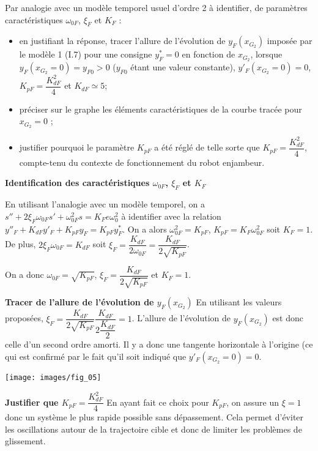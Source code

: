 \documentclass[11pt]{article}
\begin{document}
\UPSTIquestion Par analogie avec un modèle temporel usuel d’ordre 2 à identifier, de paramètres caractéristiques $\omega_{0F}$, $\xi_F$ et $K_F$ :
\begin{itemize}
\item en justifiant la réponse, tracer l’allure de l’évolution de  $y_F\left(x_{G_2}\right)$  imposée par le modèle 1 (I.7) pour une consigne $y_F^*=0$ en fonction de $x_{G_2}$, lorsque $y_F\left(x_{G_2}=0\right)=y_{F0}>0$
 ($y_{F0}$ étant une valeur constante), $y'_F\left(x_{G_2}=0\right)=0$, $K_{pF}=\dfrac{K^2_{dF}}{4}$ et $K_{dF}\simeq 5$; 
 \item préciser sur le graphe les éléments caractéristiques de la courbe tracée pour $x_{G_2}=0$ ;
\item justifier pourquoi le paramètre $K_{pF}$ a été réglé de telle sorte que $K_{pF}=\dfrac{K^2_{dF}}{4}$, compte-tenu du contexte de fonctionnement du robot enjambeur.
\end{itemize}

\begin{UPSTIcorrige}

\textbf{Identification des  caractéristiques $\omega_{0F}$, $\xi_F$ et $K_F$}

En utilisant l'analogie avec un modèle temporel, on a $s'' + 2\xi_F\omega_{0F} s' + \omega_{0F}^2 s = K_Fe\omega_0^2$ à identifier avec la relation $y''_F+K_{dF}y'_F+K_{pF}y_F=K_{pF}y^*_F$.
On a alors  $\omega_{0F}^2 =K_{pF}$, $K_{pF} = K_F\omega_{0F}^2$ soit $K_F=1$. De plus, $2\xi_F\omega_{0F} = K_{dF}$ soit $\xi_F = \dfrac{K_{dF}}{2\omega_{0F}}= \dfrac{K_{dF}}{2\sqrt{K_{pF}}}$.

On a donc $\omega_{0F}=\sqrt{K_{pF}}$, $\xi_F=\dfrac{K_{dF}}{2\sqrt{K_{pF}}} $ et $K_F=1$.


\textbf{Tracer de l’allure de l’évolution de  $y_F\left(x_{G_2}\right)$}
En utilisant les valeurs proposées, $\xi_F=\dfrac{K_{dF}}{2\sqrt{K_{pF}}}\dfrac{K_{dF}}{2\dfrac{K_{dF}}{2}} =1 $. L'allure de l'évolution de $y_F\left(x_{G_2}\right)$ est donc celle d'un second ordre amorti. Il y a donc une tangente horizontale à l'origine (ce qui est confirmé par le fait qu'il soit indiqué que $y'_F\left(x_{G_2}=0\right)=0$.

\begin{center}
\texttt{[image: images/fig\_05]}
\end{center}
\textbf{Justifier que $K_{pF}=\dfrac{K^2_{dF}}{4}$}
En ayant fait ce choix pour $K_{pF}$, on assure un $\xi=1$ donc un système le plus rapide possible sans dépassement. 
Cela permet d'éviter les oscillations autour de la trajectoire cible et donc de limiter les problèmes de glissement. 

\end{UPSTIcorrige}
\end{document}
